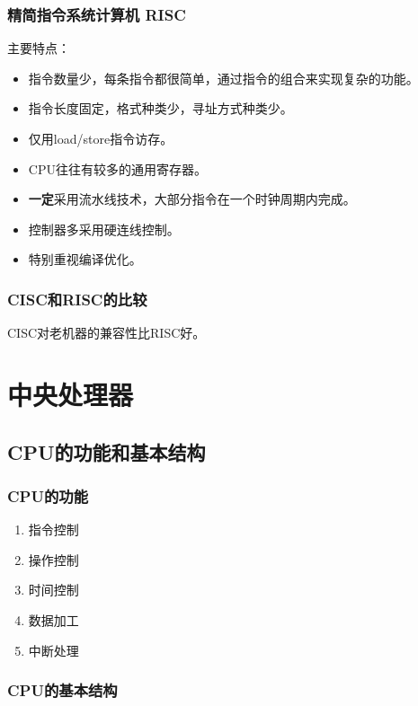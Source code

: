 \documentclass[12pt, a4paper, oneside]{ctexart}
\begin{document}
\subsubsection{精简指令系统计算机 RISC}

主要特点：
\begin{itemize}
  \item 指令数量少，每条指令都很简单，通过指令的组合来实现复杂的功能。
  \item 指令长度固定，格式种类少，寻址方式种类少。
  \item 仅用load/store指令访存。
  \item CPU往往有较多的通用寄存器。
  \item \textbf{一定}采用流水线技术，大部分指令在一个时钟周期内完成。
  \item 控制器多采用硬连线控制。
  \item 特别重视编译优化。
\end{itemize}

\subsubsection{CISC和RISC的比较}

CISC对老机器的兼容性比RISC好。

\section{中央处理器}

\subsection{CPU的功能和基本结构}

\subsubsection{CPU的功能}

\begin{enumerate}
  \item {\kaishu 指令控制}
  \item {\kaishu 操作控制}
  \item {\kaishu 时间控制}
  \item {\kaishu 数据加工}
  \item {\kaishu 中断处理}
\end{enumerate}

\subsubsection{CPU的基本结构}
\end{document}
